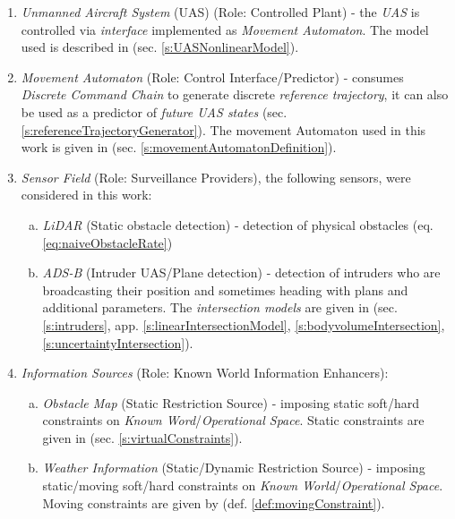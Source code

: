 \begin{enumerate}
    \item \emph{Unmanned Aircraft System} (UAS) (Role: Controlled Plant) - the \emph{UAS} is controlled via \emph{interface} implemented as \emph{Movement Automaton}. The model used is described in (sec. \ref{s:UASNonlinearModel}).
    
    \item \emph{Movement Automaton} (Role: Control Interface/Predictor) - consumes \emph{Discrete Command Chain} to generate discrete \emph{reference trajectory}, it can  also be used as a predictor of \emph{future UAS states} (sec. \ref{s:referenceTrajectoryGenerator}). The movement Automaton used in this work is given in (sec. \ref{s:movementAutomatonDefinition}). 
    
    \item \emph{Sensor Field} (Role: Surveillance Providers), the following sensors, were considered in this work:
        \begin{enumerate}[a.]
            \item \emph{LiDAR} (Static obstacle detection) - detection of physical obstacles (eq. \ref{eq:naiveObstacleRate})
            
            \item \emph{ADS-B} (Intruder UAS/Plane detection) - detection of intruders who are broadcasting their position and sometimes heading with plans and additional parameters. The \emph{intersection models} are given in (sec. \ref{s:intruders}, app. \ref{s:linearIntersectionModel}, \ref{s:bodyvolumeIntersection}, \ref{s:uncertaintyIntersection}).
        \end{enumerate}

    \newpage
    \item \emph{Information Sources} (Role: Known World Information Enhancers): 
        \begin{enumerate}[a.]
            \item \emph{Obstacle Map} (Static Restriction Source) - imposing static soft/hard constraints on \emph{Known Word}/\emph{Operational Space}. Static constraints are given in (sec. \ref{s:virtualConstraints}).
            
            \item \emph{Weather Information} (Static/Dynamic Restriction Source) - imposing static/mo\-vi\-ng soft/hard constraints on \emph{Known World}/\emph{Operational Space}. Moving constraints are given by (def. \ref{def:movingConstraint}).
            

\end{enumerate}
\end{enumerate}
